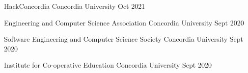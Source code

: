 

\begin{cvcomms}

  \cvcomm
    {HackConcordia} %
    {} %
    {Concordia University} %
    {Oct 2021} %

  \cvcomm
    {Engineering and Computer Science Association} %
    {} %
    {Concordia University} %
    {Sept 2020} %

  \cvcomm
    {Software Engineering and Computer Science Society} %
    {} %
    {Concordia University} %
    {Sept 2020} %

  \cvcomm
    {Institute for Co-operative Education} %
    {} %
    {Concordia University} %
    {Sept 2020} %

\end{cvcomms}
